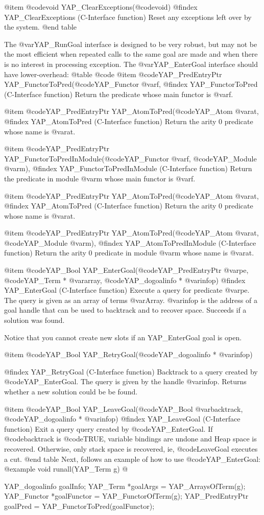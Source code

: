 {{{{{{{{{@item  @code{void} YAP_ClearExceptions(@code{void})
@findex YAP_ClearExceptions (C-Interface function)
Reset any exceptions left over by the system.
@end table

The @var{YAP_RunGoal} interface is designed to be very robust, but may
not be the most efficient when repeated calls to the same goal are made
and when there is no interest in processing exception. The
@var{YAP_EnterGoal} interface should have lower-overhead:
@table @code
@item  @code{YAP_PredEntryPtr} YAP_FunctorToPred(@code{YAP_Functor} @var{f},
@findex YAP_FunctorToPred (C-Interface function)
Return the predicate whose main functor is @var{f}.

@item  @code{YAP_PredEntryPtr} YAP_AtomToPred(@code{YAP_Atom} @var{at},
@findex YAP_AtomToPred (C-Interface function)
Return the arity 0 predicate whose name is @var{at}.

@item  @code{YAP_PredEntryPtr}
YAP_FunctorToPredInModule(@code{YAP_Functor} @var{f}, @code{YAP_Module} @var{m}),
@findex YAP_FunctorToPredInModule (C-Interface function)
Return the predicate in module @var{m} whose main functor is @var{f}.

@item  @code{YAP_PredEntryPtr} YAP_AtomToPred(@code{YAP_Atom} @var{at},
@findex YAP_AtomToPred (C-Interface function)
Return the arity 0 predicate whose name is @var{at}.

@item  @code{YAP_PredEntryPtr} YAP_AtomToPred(@code{YAP_Atom} @var{at}, @code{YAP_Module} @var{m}),
@findex YAP_AtomToPredInModule (C-Interface function)
Return the arity 0 predicate in module @var{m} whose name is @var{at}.

@item  @code{YAP_Bool} YAP_EnterGoal(@code{YAP_PredEntryPtr} @var{pe},
@code{YAP_Term *} @var{array}, @code{YAP_dogoalinfo *} @var{infop})
@findex YAP_EnterGoal (C-Interface function)
Execute a  query for predicate @var{pe}. The query is given as an
array of terms @var{Array}. @var{infop} is the address of a goal
handle that can be used to backtrack and to recover space. Succeeds if
a solution was found.

Notice that you cannot create new slots if an YAP_EnterGoal goal is open.

@item  @code{YAP_Bool} YAP_RetryGoal(@code{YAP_dogoalinfo *} @var{infop})

@findex YAP_RetryGoal (C-Interface function)
Backtrack to a query created by @code{YAP_EnterGoal}. The query is
given by the handle @var{infop}. Returns whether a new solution could
be be found.

@item  @code{YAP_Bool} YAP_LeaveGoal(@code{YAP_Bool} @var{backtrack},
@code{YAP_dogoalinfo *} @var{infop})
@findex YAP_LeaveGoal (C-Interface function)
Exit a query query created by @code{YAP_EnterGoal}. If
@code{backtrack} is @code{TRUE}, variable bindings are undone and Heap
space is recovered.  Otherwise, only stack space is recovered, ie,
@code{LeaveGoal} executes a cut.
@end table
Next, follows an example of how to use @code{YAP_EnterGoal}:
@example
void
runall(YAP_Term g)
@{
    YAP_dogoalinfo goalInfo;
    YAP_Term *goalArgs = YAP_ArraysOfTerm(g);
    YAP_Functor *goalFunctor = YAP_FunctorOfTerm(g);
    YAP_PredEntryPtr goalPred = YAP_FunctorToPred(goalFunctor);
    
}}}}}}}}}}
